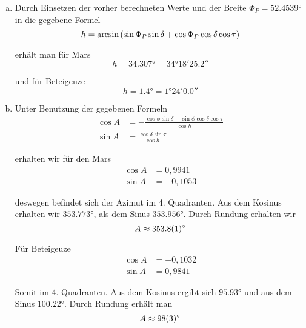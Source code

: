 \documentclass[a4paper,german,12pt,smallheadings]{scrartcl}
\newcommand*{\ra}[2][]{{
  \def\SIUnitSymbolDegree{\textsuperscript{h}}%
  \def\SIUnitSymbolArcminute{\textsuperscript{m}}%
  \def\SIUnitSymbolArcsecond{\textsuperscript{s}}%
  \ang[#1]{#2}}%
}
\begin{document}
\begin{enumerate}[a)]
    Somit ergibt sich für Mars
    \begin{equation}
      \tau = \ra{-0.3334} = \ra{23.6666} = \ra{23;40;0}
    \end{equation}

    Und für Beteigeuze
    \begin{equation}
      \tau = \ra{6.4936} = \ra{6;29;37}
    \end{equation}
  \item
    Durch Einsetzen der vorher berechneten Werte und der Breite $\Phi_P =
    \ang{52.4539}$ in die gegebene Formel
    \begin{equation}
      h = \arcsin \del{\sin \Phi_P \sin \delta + \cos \Phi_P \cos \delta \cos \tau}
    \end{equation}

    erhält man für Mars
    \begin{equation}
      h = \ang{34.307} = \ang{34;18;25.2}
    \end{equation}

    und für Beteigeuze
    \begin{equation}
      h = \ang{1.4} = \ang{1;24;0.0}
    \end{equation}
  \item
    Unter Benutzung der gegebenen Formeln
    \begin{align}
      \cos A &= -\frac{\cos \phi \sin \delta - \sin \phi \cos \delta \cos \tau}{\cos h} \\
      \sin A &= \frac{\cos \delta \sin \tau}{\cos h}
    \end{align}

    erhalten wir für den Mars
    \begin{align}
      \cos A &= 0{,}9941 \\
      \sin A &= -0{,}1053
    \end{align}

    deswegen befindet sich der Azimut im 4. Quadranten. Aus dem Kosinus
    erhalten wir $\ang{353.773}$, als dem Sinus $\ang{353.956}$. Durch Rundung
    erhalten wir
    \begin{equation}
      A \approx \ang{353.8+-0.1}
    \end{equation}

    Für Beteigeuze
    \begin{align}
      \cos A &= -0{,}1032 \\
      \sin A &= 0{,}9841
    \end{align}

    Somit im 4. Quadranten. Aus dem Kosinus ergibt sich $\ang{95.93}$ und aus
    dem Sinus $\ang{100.22}$. Durch Rundung erhält man
    \begin{equation}
      A \approx \ang{98+-3}
    \end{equation}



\end{enumerate}
\end{document}
